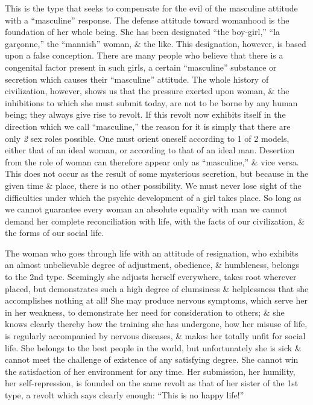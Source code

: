 \documentclass{article}
\begin{document}
This is the type that seeks to compensate for the evil of the masculine attitude with a ``masculine'' response. The defense attitude toward womanhood is the foundation of her whole being. She has been designated ``the boy-girl,'' ``la gar\c{c}onne,'' the ``mannish'' woman, \& the like. This designation, however, is based upon a false conception. There are many people who believe that there is a congenital factor present in such girls, a certain ``masculine'' substance or secretion which causes their ``masculine'' attitude. The whole history of civilization, however, shows us that the pressure exerted upon woman, \& the inhibitions to which she must submit today, are not to be borne by any human being; they always give rise to revolt. If this revolt now exhibits itself in the direction which we call ``masculine,'' the reason for it is simply that there are only {\it2} sex roles possible. One must orient oneself according to 1 of 2 models, either that of an ideal woman, or according to that of an ideal man. Desertion from the role of woman can therefore appear only as ``masculine,'' \& vice versa. This does not occur as the result of some mysterious secretion, but because in the given time \& place, there is no other possibility. We must never lose sight of the difficulties under which the psychic development of a girl takes place. So long as we cannot guarantee every woman an absolute equality with man we cannot demand her complete reconciliation with life, with the facts of our civilization, \& the forms of our social life.

The woman who goes through life with an attitude of resignation, who exhibits an almost unbelievable degree of adjustment, obedience, \& humbleness, belongs to the 2nd type. Seemingly she adjusts herself everywhere, takes root wherever placed, but demonstrates such a high degree of clumsiness \& helplessness that she accomplishes nothing at all! She may produce nervous symptoms, which serve her in her weakness, to demonstrate her need for consideration to others; \& she knows clearly thereby how the training she has undergone, how her misuse of life, is regularly accompanied by nervous diseases, \& makes her totally unfit for social life. She belongs to the best people in the world, but unfortunately she is sick \& cannot meet the challenge of existence of any satisfying degree. She cannot win the satisfaction of her environment for any time. Her submission, her humility, her self-repression, is founded on the same revolt as that of her sister of the 1st type, a revolt which says clearly enough: ``This is no happy life!''
\end{document}
